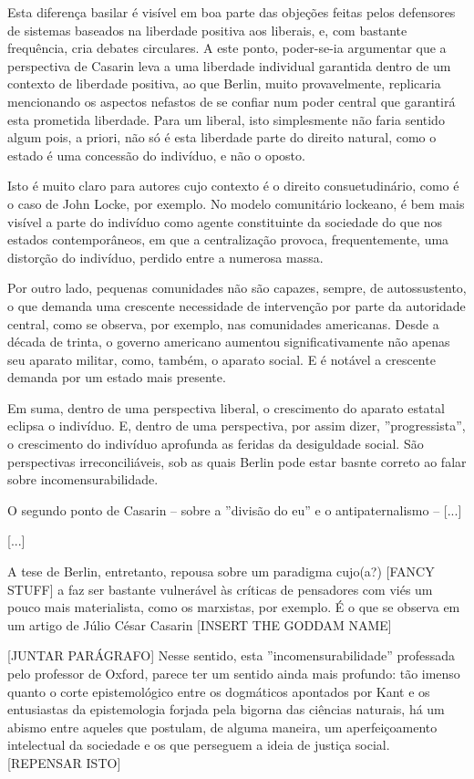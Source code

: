\documentclass[12pt,a4paper]{article}
\begin{document}
	Esta diferença basilar é visível em boa parte das objeções feitas 
	pelos defensores de sistemas baseados na liberdade positiva aos 
	liberais, e, com bastante frequência, cria debates circulares. A 
	este ponto, poder-se-ia argumentar que a perspectiva de Casarin 
	leva a uma liberdade individual garantida dentro de um contexto de 
	liberdade positiva, ao que Berlin, muito provavelmente, replicaria 
	mencionando os aspectos nefastos de se confiar num poder central 
	que garantirá esta prometida liberdade. Para um liberal, isto 
	simplesmente não faria sentido algum pois, a priori, não só é 
	esta liberdade parte do direito natural, como o estado é uma 
	concessão do indivíduo, e não o oposto. 

	Isto é muito claro para autores cujo contexto é o direito 
	consuetudinário, como é o caso de John Locke, por exemplo. 
	No modelo comunitário lockeano, é bem mais visível a parte 
	do indivíduo como agente constituinte da sociedade do que nos 
	estados contemporâneos, em que a centralização provoca, 
	frequentemente, uma distorção do indivíduo, perdido entre a 
	numerosa massa. 

	Por outro lado, pequenas comunidades não são capazes, sempre, de 
	autossustento, o que demanda uma crescente necessidade de intervenção 
	por parte da autoridade central, como se observa, por exemplo, nas 
	comunidades americanas. Desde a década de trinta, o governo americano 
	aumentou significativamente não apenas seu aparato militar, como, 
	também, o aparato social. E é notável a crescente demanda por 
	um estado mais presente. 

	Em suma, dentro de uma perspectiva liberal, o crescimento do aparato 
	estatal eclipsa o indivíduo. E, dentro de uma perspectiva, por assim 
	dizer, ”progressista”, o crescimento do indivíduo aprofunda as feridas 
	da desiguldade social. São perspectivas irreconciliáveis, sob as quais 
	Berlin pode estar basnte correto ao falar sobre incomensurabilidade. 

	O segundo ponto de Casarin -- sobre a ”divisão do eu” e o 
	antipaternalismo -- [...] 

	[...]
	\newpage

	A tese de Berlin, entretanto, repousa sobre um paradigma cujo(a?)
	[FANCY STUFF] a faz ser bastante vulnerável às críticas de pensadores 
	com viés um pouco mais materialista, como os marxistas, por exemplo. 
	É o que se observa em um artigo de Júlio César Casarin [INSERT THE GODDAM NAME]
	
	[JUNTAR PARÁGRAFO]
	Nesse sentido, esta ”incomensurabilidade” professada pelo professor 
	de Oxford, parece ter um sentido ainda mais profundo: tão imenso  
	quanto o corte epistemológico entre os dogmáticos apontados por Kant 
	e os entusiastas da epistemologia forjada pela bigorna das ciências 
	naturais, há um abismo entre aqueles que postulam, de alguma maneira, 
	um aperfeiçoamento intelectual da sociedade e os que perseguem a ideia 
	de justiça social. [REPENSAR ISTO]
	

	
	
	
\end{document}
